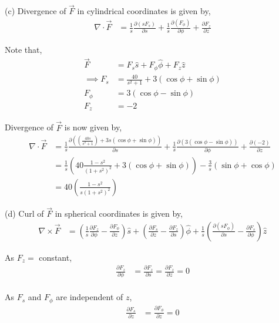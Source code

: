 \documentclass[12pt]{article}
\providecommand{\brak}[1]{\ensuremath{\left(#1\right)}}
\begin{document}
(c) Divergence of $\vec{F}$ in cylindrical coordinates is given by,
\begin{align*}
    \nabla \cdot \vec{F} &= \frac{1}{s} \frac{\partial \brak{s F_s}}{\partial s} + \frac{1}{s} \frac{\partial \brak{F_{\phi}}}{\partial \phi} + \frac{\partial F_z}{\partial z}
\end{align*}

Note that,
\begin{align*}
    \vec{F} &= F_s \hat{s} + F_{\phi} \hat{\phi} + F_z \hat{z}\\
    \implies F_s &= \frac{40}{s^2 + 1} + 3\brak{\cos{\phi} + \sin{\phi}}\\
    F_{\phi} &= 3\brak{\cos{\phi} - \sin{\phi}}\\
    F_z &= -2
\end{align*}

Divergence of $\vec{F}$ is now given by,
\begin{align*}
    \nabla \cdot \vec{F} &= \frac{1}{s} \frac{\partial \brak{\brak{\frac{40s}{s^2 + 1}} + 3s\brak{\cos{\phi} + \sin{\phi}}}}{\partial s} + \frac{1}{s} \frac{\partial \brak{3\brak{\cos{\phi} - \sin{\phi}}}}{\partial \phi} + \frac{\partial \brak{-2}}{\partial z}\\
    &= \frac{1}{s} \brak{40\frac{1 - s^2}{\brak{1 + s^2}^2} + 3\brak{\cos{\phi} + \sin{\phi}}} - \frac{3}{s} \brak{\sin{\phi} + \cos{\phi}}\\
    &= 40\brak{\frac{1 - s^2}{s\brak{1 + s^2}^2}}
\end{align*}

(d) Curl of $\vec{F}$ in spherical coordinates is given by,
\begin{align*}
\nabla \times \vec{F} &= \left( \frac{1}{s} \frac{\partial F_z}{\partial \phi} - \frac{\partial F_\phi}{\partial z} \right) \hat{s}
+ \left( \frac{\partial F_s}{\partial z} - \frac{\partial F_z}{\partial s} \right) \hat{\phi}
+ \frac{1}{s} \left( \frac{\partial (s F_\phi)}{\partial s} - \frac{\partial F_s}{\partial \phi} \right) \hat{z}
\end{align*}

As $F_z = $ constant,
\begin{align*}
    \frac{\partial F_z}{\partial \phi} &= \frac{\partial F_z}{\partial s} = \frac{\partial F_z}{\partial z} = 0\\
\end{align*}

As $F_s$ and $F_{\phi}$ are independent of $z$,
\begin{align*}
    \frac{\partial F_s}{\partial z} &= \frac{\partial F_{\phi}}{\partial z} = 0
\end{align*}
\end{document}
